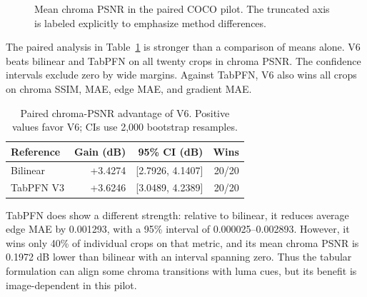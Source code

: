 \documentclass[10pt,twocolumn]{article}
\newcommand{\model}{V6}
\begin{document}
\begin{figure}[t]
  \centering
  \caption{Mean chroma PSNR in the paired COCO pilot.  The truncated axis is
  labeled explicitly to emphasize method differences.}
  \label{fig:psnr}
\end{figure}

The paired analysis in Table~\ref{tab:paired} is stronger than a comparison of
means alone.  \model{} beats bilinear and TabPFN on all twenty crops in chroma
PSNR.  The confidence intervals exclude zero by wide margins.  Against TabPFN,
\model{} also wins all crops on chroma SSIM, MAE, edge MAE, and gradient MAE.

\begin{table}[t]
  \centering
  \caption{Paired chroma-PSNR advantage of \model{}.  Positive values favor
  \model{}; CIs use 2,000 bootstrap resamples.}
  \label{tab:paired}
  \begin{tabular}{lrrr}
    \toprule
    Reference & Gain (dB) & 95\% CI (dB) & Wins \\
    \midrule
    Bilinear & +3.4274 & [2.7926, 4.1407] & 20/20 \\
    TabPFN V3 & +3.6246 & [3.0489, 4.2389] & 20/20 \\
    \bottomrule
  \end{tabular}
\end{table}

TabPFN does show a different strength: relative to bilinear, it reduces average
edge MAE by 0.001293, with a 95\% interval of 0.000025--0.002893.  However, it
wins only 40\% of individual crops on that metric, and its mean chroma PSNR is
0.1972 dB lower than bilinear with an interval spanning zero.  Thus the tabular
formulation can align some chroma transitions with luma cues, but its benefit is
image-dependent in this pilot.
\end{document}
